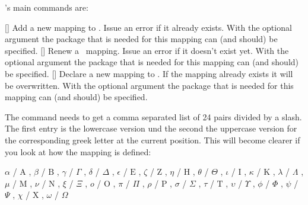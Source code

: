 \documentclass[load-preamble+]{cnltx-doc}
\begin{document}
\chemgreek's main commands are:
\begin{commands}
  []
    Add a new mapping to \chemgreek.  Issue an error if it
    already exists.  With the optional argument the package that is needed for
    this mapping can (and should) be specified.
  []
    Renew a \chemgreek\ mapping.  Issue an error if it
    doesn't exist yet.  With the optional argument the package that is needed
    for this mapping can (and should) be specified.
  []
    Declare a new mapping to \chemgreek.  If the mapping
    already exists it will be overwritten.  With the optional argument the
    package that is needed for this mapping can (and should) be specified.
\end{commands}

The command  needs to get a comma separated list of
24 pairs divided by a slash.  The first entry is the lowercase version und the
second the uppercase version for the corresponding greek letter at the current
position.  This will become clearer if you look at how the 
mapping is defined:

\begin{sourcecode}
    {
      \ensuremath{\alpha}   / \ensuremath{\mathrm{A}} , %
      \ensuremath{\beta}    / \ensuremath{\mathrm{B}} , %
      \ensuremath{\gamma}   / \ensuremath{\Gamma} ,     %
      \ensuremath{\delta}   / \ensuremath{\Delta} ,     %
      \ensuremath{\epsilon} / \ensuremath{\mathrm{E}} , %
      \ensuremath{\zeta}    / \ensuremath{\mathrm{Z}} , %
      \ensuremath{\eta}     / \ensuremath{\mathrm{H}} , %
      \ensuremath{\theta}   / \ensuremath{\Theta} ,     %
      \ensuremath{\iota}    / \ensuremath{\mathrm{I}} , %
      \ensuremath{\kappa}   / \ensuremath{\mathrm{K}} , %
      \ensuremath{\lambda}  / \ensuremath{\Lambda} ,    %
      \ensuremath{\mu}      / \ensuremath{\mathrm{M}} , %
      \ensuremath{\nu}      / \ensuremath{\mathrm{N}} , %
      \ensuremath{\xi}      / \ensuremath{\Xi} ,        %
      \ensuremath{o}        / \ensuremath{\mathrm{O}} , %
      \ensuremath{\pi}      / \ensuremath{\Pi} ,        %
      \ensuremath{\rho}     / \ensuremath{\mathrm{P}} , %
      \ensuremath{\sigma}   / \ensuremath{\Sigma} ,     %
      \ensuremath{\tau}     / \ensuremath{\mathrm{T}} , %
      \ensuremath{\upsilon} / \ensuremath{\Upsilon} ,   %
      \ensuremath{\phi}     / \ensuremath{\Phi} ,       %
      \ensuremath{\psi}     / \ensuremath{\Psi} ,       %
      \ensuremath{\chi}     / \ensuremath{\mathrm{X}} , %
      \ensuremath{\omega}   / \ensuremath{\Omega}       %
  }
\end{sourcecode}
\end{document}
